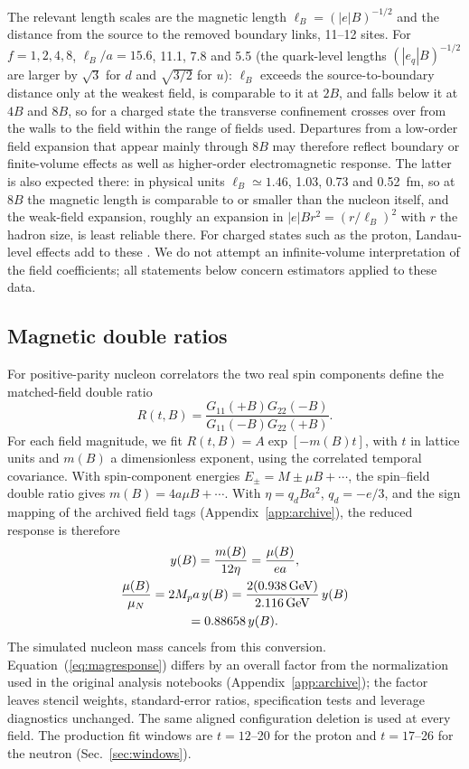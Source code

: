 \documentclass[aps,prd,reprint,twocolumn,superscriptaddress,nofootinbib,longbibliography]{revtex4-2}
\begin{document}
The relevant length scales are the magnetic length $\ell_B=(|e|B)^{-1/2}$ and the distance from the source to the removed boundary links, 11--12 sites. For $f=1,2,4,8$, $\ell_B/a=15.6$, 11.1, 7.8 and 5.5 (the quark-level lengths $(|e_q|B)^{-1/2}$ are larger by $\sqrt3$ for $d$ and $\sqrt{3/2}$ for $u$): $\ell_B$ exceeds the source-to-boundary distance only at the weakest field, is comparable to it at $2B$, and falls below it at $4B$ and $8B$, so for a charged state the transverse confinement crosses over from the walls to the field within the range of fields used. Departures from a low-order field expansion that appear mainly through $8B$ may therefore reflect boundary or finite-volume effects as well as higher-order electromagnetic response. The latter is also expected there: in physical units $\ell_B\simeq1.46$, 1.03, 0.73 and 0.52~fm, so at $8B$ the magnetic length is comparable to or smaller than the nucleon itself, and the weak-field expansion, roughly an expansion in $|e|Br^2=(r/\ell_B)^2$ with $r$ the hadron size, is least reliable there. For charged states such as the proton, Landau-level effects add to these \cite{TiburziVayl2013,Bignell2020Nucleon}. We do not attempt an infinite-volume interpretation of the field coefficients; all statements below concern estimators applied to these data.

\subsection{Magnetic double ratios}

For positive-parity nucleon correlators the two real spin components define the matched-field double ratio
\begin{equation}
R(t,B)=\frac{G_{11}(+B)G_{22}(-B)}{G_{11}(-B)G_{22}(+B)}.
\label{eq:doubleratio}
\end{equation}
For each field magnitude, we fit $R(t,B)=A\exp[-m(B)t]$, with $t$ in lattice units and $m(B)$ a dimensionless exponent, using the correlated temporal covariance. With spin-component energies $E_\pm=M\pm\mu B+\cdots$, the spin--field double ratio gives $m(B)=4a\mu B+\cdots$. With $\eta=q_dBa^2$, $q_d=-e/3$, and the sign mapping of the archived field tags (Appendix~\ref{app:archive}), the reduced response is therefore
\begin{equation}
\begin{gathered}
y(B)=\frac{m(B)}{12\eta}=\frac{\mu(B)}{ea},\\
\frac{\mu(B)}{\mu_N}=2M_p a\,y(B)
=\frac{2(0.938\,{\rm GeV})}{2.116\,{\rm GeV}}\,y(B)\\
=0.88658\,y(B).
\end{gathered}
\label{eq:magresponse}
\end{equation}
The simulated nucleon mass cancels from this conversion. Equation~(\ref{eq:magresponse}) differs by an overall factor from the normalization used in the original analysis notebooks (Appendix~\ref{app:archive}); the factor leaves stencil weights, standard-error ratios, specification tests and leverage diagnostics unchanged. The same aligned configuration deletion is used at every field. The production fit windows are $t=12$--20 for the proton and $t=17$--26 for the neutron (Sec.~\ref{sec:windows}).
\end{document}
